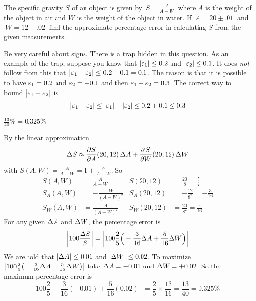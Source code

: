 \begin{question}
The specific gravity $S$ of an object is given by $\ S=\frac{A}{A-W}\ $
where $A$ is the weight of the object in air and $W$ is the weight of the
object in water. If $\ A=20\pm .01\ $ and $\ W=12\pm.02\ $ find the 
approximate percentage error in calculating $S$ from the given measurements.
\end{question}

\begin{hint}
Be very careful about signs. There is a trap hidden in this question.
As an example of the trap, suppose you know that $|\varepsilon_1|\le 0.2$
and $|\varepsilon_2|\le 0.1$. It does \emph{not} follow from this
that $\big|\varepsilon_1-\varepsilon_2|\le 0.2 -0.1 =0.1$. The reason is that 
it is possible to have $\varepsilon_1=0.2$ and $\varepsilon_2=-0.1$ and then
$\varepsilon_1-\varepsilon_2=0.3$. The correct way to bound $\big|\varepsilon_1-\varepsilon_2|$
is
\begin{equation*}
\big|\varepsilon_1-\varepsilon_2| \le |\varepsilon_1|+ |\varepsilon_2|\le 0.2+0.1\le 0.3
\end{equation*}
\end{hint}

\begin{answer}
$\frac{13}{40}\%=0.325\%$
\end{answer}

\begin{solution}
By the linear approximation
\begin{align*}
\De S\approx \pdiff{S}{A}(20,12)\,\De A
+\pdiff{S}{W}(20,12)\,\De W
\end{align*}
with $S(A,W)=\frac{A}{A-W} =1+\frac{W}{A-W}$. So
\begin{align*}
S(A,W)&=\frac{A}{A-W} & S(20,12)&=\frac{20}{8}=\frac{5}{2}\\
S_A(A,W)&=-\frac{W}{(A-W)^2} & S_A(20,12)&=-\frac{12}{8^2}=-\frac{3}{16}\\
S_W(A,W)&=\frac{A}{(A-W)^2} & S_W(20,12)&=\frac{20}{8^2}=\frac{5}{16}
\end{align*}
For any given $\Delta A$ and $\Delta W$, the percentage error is
\begin{equation*}
\left|100\frac{\Delta S}{S}\right|
=\left|100\frac{2}{5}\Big(-\frac{3}{16}\Delta A+\frac{5}{16}\Delta W\Big)\right|
\end{equation*}
We are told that $|\Delta A|\le 0.01$ and $|\Delta W|\le 0.02$. To maximize
$\big|100\frac{2}{5}\big(-\frac{3}{16}\Delta A+\frac{5}{16}\Delta W\big)\big|$
take $\Delta A=- 0.01$ and $\Delta W=+ 0.02$. So the maximum percentage error
is
\begin{equation*}
100\frac{2}{5}\left[-\frac{3}{16}(- 0.01)+\frac{5}{16}(0.02)\right]
= \frac{2}{5}\times \frac{13}{16}
=\frac{13}{40}=0.325\%
\end{equation*}
\end{solution}



